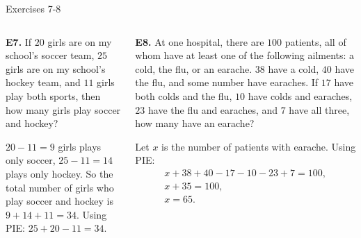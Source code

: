 \documentclass[9pt,aspectratio=169]{beamer}
\begin{document}
\begin{frame}{Exercises 7-8}
  \begin{columns}[T]
    \begin{column}{0.5\textwidth}
      \begin{problem}
        \textbf{E7.} If $20$ girls are on my school's soccer team, $25$ girls are on my school's hockey team, and $11$ girls play both sports, then how many girls play soccer and hockey?
      \end{problem}
      $20 - 11 = 9$ girls plays only soccer, $25 - 11 = 14$ plays only hockey. So the total number of girls who play soccer and hockey is $9 + 14 + 11 = \boxed{34}$. Using PIE: $25 + 20 - 11 = \boxed{34}$.
    \end{column}
    \begin{column}{0.5\textwidth}
      \begin{problem}
        \textbf{E8.} At one hospital, there are $100$ patients, all of whom have at least one of the following ailments: a cold, the flu, or an earache. $38$ have a cold, $40$ have the flu, and some number have earaches. If $17$ have both colds and the flu, $10$ have colds and earaches, $23$ have the flu and earaches, and $7$ have all three, how many have an earache?
      \end{problem}
      Let $x$ is the number of patients with earache. Using PIE:
      \begin{gather*}
        x + 38 + 40 - 17 - 10 - 23 + 7 = 100,\\
        x + 35 = 100,\\
        x = \boxed{65}.
      \end{gather*}
    \end{column}
  \end{columns}
\end{frame}
\end{document}
